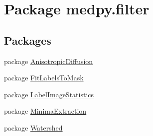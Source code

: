 \hypertarget{namespacemedpy_1_1filter}{
\section{Package medpy.filter}
\label{namespacemedpy_1_1filter}
}
\subsection*{Packages}
\begin{DoxyCompactItemize}
\item 
package \hyperlink{namespacemedpy_1_1filter_1_1AnisotropicDiffusion}{AnisotropicDiffusion}
\item 
package \hyperlink{namespacemedpy_1_1filter_1_1FitLabelsToMask}{FitLabelsToMask}
\item 
package \hyperlink{namespacemedpy_1_1filter_1_1LabelImageStatistics}{LabelImageStatistics}
\item 
package \hyperlink{namespacemedpy_1_1filter_1_1MinimaExtraction}{MinimaExtraction}
\item 
package \hyperlink{namespacemedpy_1_1filter_1_1Watershed}{Watershed}
\end{DoxyCompactItemize}
